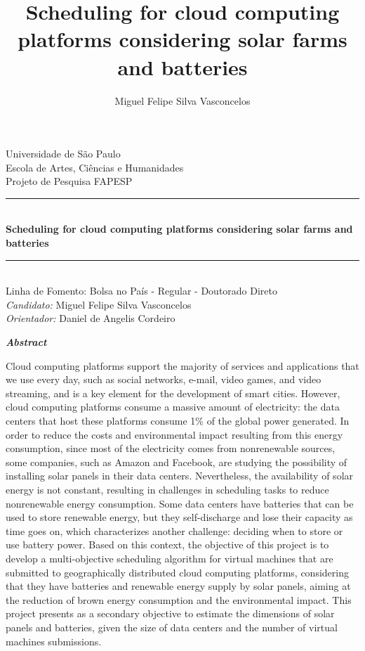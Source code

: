 \documentclass[12pt,a4paper]{article}
\title{Scheduling for cloud computing platforms considering solar farms and batteries}
\author{Miguel Felipe Silva Vasconcelos}
\date{}
\begin{document}

\begin{center}
    \begin{center}
        { \sc Universidade de São Paulo} \\
        { \sc Escola de Artes, Ciências e Humanidades}\\[0.7cm]

        {\large \sc Projeto de Pesquisa FAPESP}\\
        \rule{0.9\linewidth}{0.5mm} \\[0.4cm]
        {\large \bfseries Scheduling for cloud computing platforms considering solar farms and batteries}\\
        \rule{0.9\linewidth}{0.5mm} \\[0.4cm]
        {\small \sc Linha de Fomento: Bolsa no País - Regular - Doutorado Direto}\\[0.4cm]
        { \emph{ Candidato:} Miguel Felipe Silva Vasconcelos\\
         \emph{ Orientador:} Daniel de Angelis Cordeiro}\\[1.6cm]
    \end{center}
\end{center}


\begin{center}
    {\bf  \textit{Abstract}}
\end{center}

Cloud computing platforms support the majority of services and applications that we use every day, such as social networks, e-mail, video games, and video streaming, and is a key element for the development of smart cities. However, cloud computing platforms consume a massive amount of electricity: the data centers that host these platforms consume 1\% of the global power generated. In order to reduce the costs and environmental impact resulting from this energy consumption, since most of the electricity comes from nonrenewable sources, some companies, such as Amazon and Facebook, are studying the possibility of installing solar panels in their data centers. Nevertheless, the availability of solar energy is not constant, resulting in challenges in scheduling tasks to reduce nonrenewable energy consumption. Some data centers have batteries that can be used to store renewable energy, but they self-discharge and lose their capacity as time goes on, which characterizes another challenge: deciding when to store or use battery power. Based on this context, the objective of this project is to develop a multi-objective scheduling algorithm for virtual machines that are submitted to geographically distributed cloud computing platforms, considering that they have batteries and renewable energy supply by solar panels, aiming at the reduction of brown energy consumption and the environmental impact. This project presents as a secondary objective to estimate the dimensions of solar panels and batteries, given the size of data centers and the number of virtual machines submissions.\\
\end{document}
